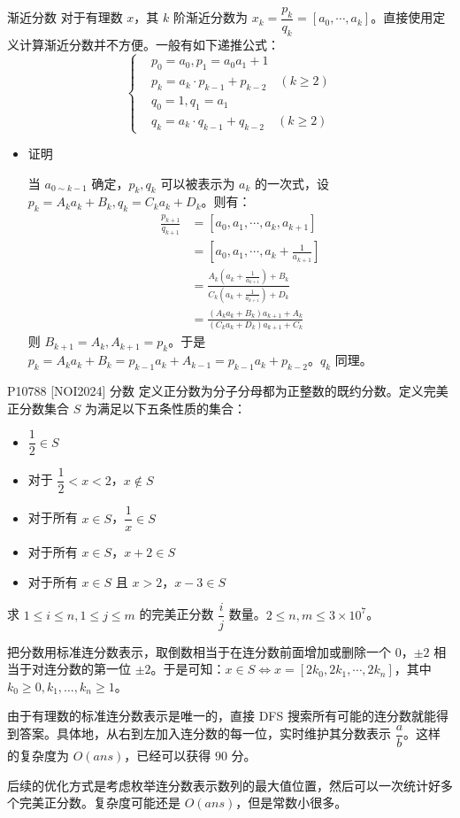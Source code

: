 \documentclass [hyperref={bookmarksdepth=4}, aspectratio=169] {beamer}
\theoremstyle {fy}
\begin{document}
\begin{frame}{渐近分数}
对于有理数 $x$，其 $k$ 阶渐近分数为 $x_k=\dfrac{p_k}{q_k}=[a_0,\cdots,a_k]$。直接使用定义计算渐近分数并不方便。一般有如下递推公式：
$$
\left\{
\begin{aligned}
&p_0=a_0,p_1=a_0a_1+1\\
&p_k=a_k\cdot p_{k-1}+p_{k-2}\quad (k\ge 2)\\
&q_0=1,q_1=a_1\\
&q_k=a_k\cdot q_{k-1}+q_{k-2}\quad (k\ge 2)
\end{aligned}
\right.
$$

\begin{itemize}
    \item 证明

  当 $a_{0\sim k-1}$ 确定，$p_k,q_k$ 可以被表示为 $a_k$ 的一次式，设 $p_k=A_ka_k+B_k,q_k=C_ka_k+D_k$。则有：
  $$
  \begin{aligned}
  \frac{p_{k+1}}{q_{k+1}}&=[a_0,a_1,\cdots,a_k,a_{k+1}]\\
  &=[a_0,a_1,\cdots,a_k+\frac{1}{a_{k+1}}]\\
  &=\frac{A_k(a_k+\frac{1}{a_{k+1}})+B_k}{C_k(a_k+\frac{1}{a_{k+1}})+D_k}\\
  &=\frac{(A_ka_k+B_k)a_{k+1}+A_k}{(C_ka_k+D_k)a_{k+1}+C_k}
  \end{aligned}
  $$
  则 $B_{k+1}=A_k,A_{k+1}=p_k$。于是 $p_k=A_ka_k+B_k=p_{k-1}a_k+A_{k-1}=p_{k-1}a_k+p_{k-2}$。$q_k$ 同理。
\end{itemize}
\end{frame}

\begin{frame}{P10788 [NOI2024] 分数}
定义正分数为分子分母都为正整数的既约分数。定义完美正分数集合 $S$ 为满足以下五条性质的集合：

\begin{itemize}
    \item $\dfrac{1}{2}\in S$
    \item 对于 $\dfrac{1}{2}<x<2$，$x\not\in S$
    \item 对于所有 $x\in S$，$\dfrac{1}{x}\in S$
    \item 对于所有 $x\in S$，$x+2\in S$
    \item 对于所有 $x\in S$ 且 $x>2$，$x-3\in S$
\end{itemize}

求 $1\le i\le n,1\le j\le m$ 的完美正分数 $\dfrac{i}{j}$ 数量。$2\le n,m\le 3\times10^7$。

把分数用标准连分数表示，取倒数相当于在连分数前面增加或删除一个 $0$，$\pm 2$ 相当于对连分数的第一位 $\pm 2$。于是可知：$x\in S\iff x=[2k_0,2k_1,\cdots,2k_n]$，其中 $k_0\ge 0,k_1,\dots,k_n\ge 1$。

由于有理数的标准连分数表示是唯一的，直接 DFS 搜索所有可能的连分数就能得到答案。具体地，从右到左加入连分数的每一位，实时维护其分数表示 $\dfrac{a}{b}$。这样的复杂度为 $O(ans)$，已经可以获得 $90$ 分。

后续的优化方式是考虑枚举连分数表示数列的最大值位置，然后可以一次统计好多个完美正分数。复杂度可能还是 $O(ans)$，但是常数小很多。
\end{frame}
\end{document}
